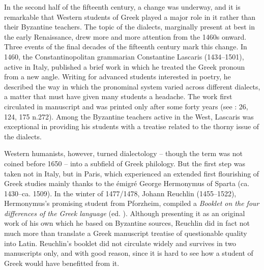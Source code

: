 In the second half of the fifteenth century, a change was underway, and it is remarkable that Western students of Greek played a major role in it rather than their Byzantine teachers. The topic of the dialects, marginally present at best in the early Renaissance, drew more and more attention from the 1460s onward. Three events of the final decades of the fifteenth century mark this change. In 1460, the Constantinopolitan grammarian Constantine Lascaris (1434–1501), active in Italy, published a brief work in which he treated the Greek pronoun from a new angle. Writing for advanced students interested in poetry, he described the way in which the pronominal system varied across different dialects, a matter that must have given many students a headache. The work first circulated in manuscript and was printed only after some forty years (see \citealt{Botley2010}: 26, 124, 175 n.272). Among the Byzantine teachers active in the West, Lascaris was exceptional in providing his students with a treatise related to the thorny issue of the dialects.

Western humanists, however, turned dialectology – though the term was not coined before 1650 – into a subfield of Greek philology. But the first step was taken not in Italy, but in Paris, which experienced an extended first flourishing of Greek studies mainly thanks to the émigré George Hermonymus of Sparta (ca. 1430–ca. 1509). In the winter of 1477/1478, Johann Reuchlin (1455–1522), Hermonymus’s promising student from Pforzheim, compiled a \textit{Booklet on the four differences of the Greek language} (ed. \citealt{VanRooy2014}). Although presenting it as an original work of his own which he based on Byzantine sources, Reuchlin did in fact not much more than translate a Greek manuscript treatise of questionable quality into Latin. Reuchlin’s booklet did not circulate widely and survives in two manuscripts only, and with good reason, since it is hard to see how a student of Greek would have benefitted from it.

